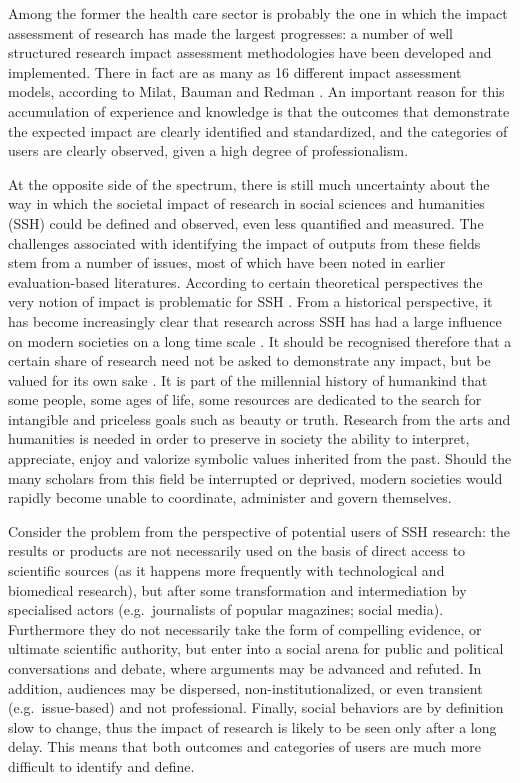 \documentclass[]{book}
\begin{document}
Among the former the health care sector is probably the one in which the
impact assessment of research has made the largest progresses: a number
of well structured research impact assessment methodologies have been
developed and implemented. There in fact are as many as 16 different
impact assessment models, according to Milat, Bauman and Redman
\citep{milat2015narrative}. An important reason for this accumulation of
experience and knowledge is that the outcomes that demonstrate the
expected impact are clearly identified and standardized, and the
categories of users are clearly observed, given a high degree of
professionalism.

At the opposite side of the spectrum, there is still much uncertainty
about the way in which the societal impact of research in social
sciences and humanities (SSH) could be defined and observed, even less
quantified and measured. The challenges associated with identifying the
impact of outputs from these fields stem from a number of issues, most
of which have been noted in earlier evaluation-based literatures.
According to certain theoretical perspectives the very notion of impact
is problematic for SSH \citep{blasi2018ssh}. From a historical
perspective, it has become increasingly clear that research across SSH
has had a large influence on modern societies on a long time scale
\citep{bod2013new}. It should be recognised therefore that a certain
share of research need not be asked to demonstrate any impact, but be
valued for its own sake \citep{small2013value}. It is part of the
millennial history of humankind that some people, some ages of life,
some resources are dedicated to the search for intangible and priceless
goals such as beauty or truth. Research from the arts and humanities is
needed in order to preserve in society the ability to interpret,
appreciate, enjoy and valorize symbolic values inherited from the past.
Should the many scholars from this field be interrupted or deprived,
modern societies would rapidly become unable to coordinate, administer
and govern themselves.

Consider the problem from the perspective of potential users of SSH
research: the results or products are not necessarily used on the basis
of direct access to scientific sources (as it happens more frequently
with technological and biomedical research), but after some
transformation and intermediation by specialised actors
(e.g.~journalists of popular magazines; social media). Furthermore they
do not necessarily take the form of compelling evidence, or ultimate
scientific authority, but enter into a social arena for public and
political conversations and debate, where arguments may be advanced and
refuted. In addition, audiences may be dispersed, non-institutionalized,
or even transient (e.g.~issue-based) and not professional. Finally,
social behaviors are by definition slow to change, thus the impact of
research is likely to be seen only after a long delay. This means that
both outcomes and categories of users are much more difficult to
identify and define.
\end{document}
